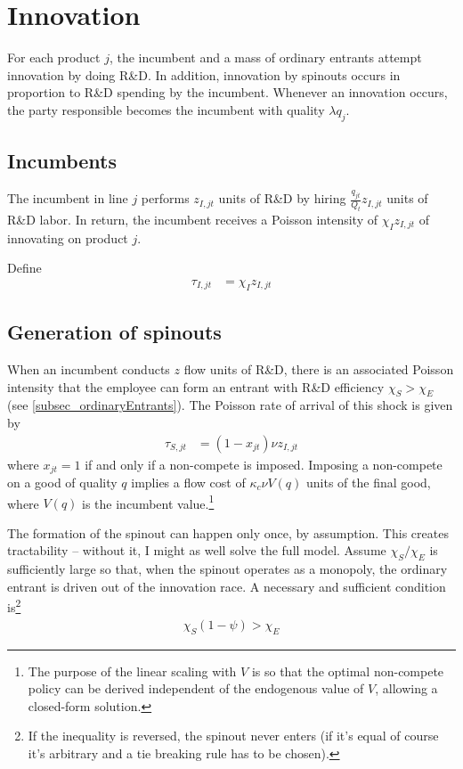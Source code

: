 \documentclass[12pt,english]{article}
\theoremstyle{remark}
\begin{document}
\section{Innovation}

For each product $j$, the incumbent and a mass of ordinary entrants attempt innovation by doing R\&D. In addition, innovation by spinouts occurs in proportion to R\&D spending by the incumbent. Whenever an innovation occurs, the party responsible becomes the incumbent with quality $\lambda q_j$. 

\subsection{Incumbents}

The incumbent in line $j$ performs $z_{I,jt}$ units of R\&D by hiring $\frac{q_{jt}}{Q_t}z_{I,jt}$ units of R\&D labor. In return, the incumbent receives a Poisson intensity of $\chi_I z_{I,jt}$ of innovating on product $j$. 

Define
\begin{align}
	\tau_{I,jt} &= \chi_I z_{I,jt}
\end{align}


\subsection{Generation of spinouts}

When an incumbent conducts $z$ flow units of R\&D, there is an associated Poisson intensity that the employee can form an entrant with R\&D efficiency $\chi_S > \chi_E$ (see  \ref{subsec_ordinaryEntrants}). The Poisson rate of arrival of this shock is given by 
\begin{align*}
	\tau_{S,jt} &= (1-x_{jt}) \nu z_{I,jt}
\end{align*} 
where $x_{jt} = 1$ if and only if a non-compete is imposed. Imposing a non-compete on a good of quality $q$ implies a flow cost of $\kappa_{c} \nu V(q)$ units of the final good, where $V(q)$ is the incumbent value.\footnote{The purpose of the linear scaling with $V$ is so that the optimal non-compete policy can be derived independent of the endogenous value of $V$, allowing a closed-form solution.}

The formation of the spinout can happen only once, by assumption. This creates tractability -- without it, I might as well solve the full model. Assume $\chi_S / \chi_E$ is sufficiently large so that, when the spinout operates as a monopoly, the ordinary entrant is driven out of the innovation race. A necessary and sufficient condition is\footnote{If the inequality is reversed, the spinout never enters (if it's equal of course it's arbitrary and a tie breaking rule has to be chosen).}
\begin{align}
	\chi_S(1-\psi) > \chi_E
\end{align}
\end{document}
